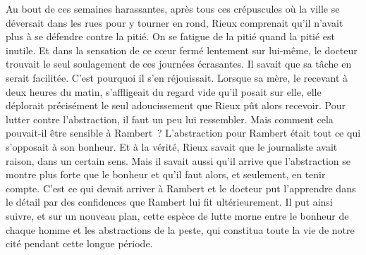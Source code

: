 \documentclass[french,twoside]{book} %
\begin{document}
Au bout de ces semaines harassantes, après tous ces crépuscules où la ville se déversait dans les rues pour y tourner en rond, Rieux comprenait qu’il n’avait plus à se défendre contre la pitié. On se fatigue de la pitié quand la pitié est inutile. Et dans la sensation de ce cœur fermé lentement sur lui-même, le docteur trouvait le seul soulagement de ces journées écrasantes. Il savait que sa tâche en serait facilitée. C’est pourquoi il s’en réjouissait. Lorsque sa mère, le recevant à deux heures du matin, s’affligeait du regard vide qu’il posait sur elle, elle déplorait précisément le seul adoucissement que Rieux pût alors recevoir. Pour lutter contre l’abstraction, il faut un peu lui ressembler. Mais comment cela pouvait-il être sensible à Rambert ? L’abstraction pour Rambert était tout ce qui s’opposait à son bonheur. Et à la vérité, Rieux savait que le journaliste avait raison, dans un certain sens. Mais il savait aussi qu’il arrive que l’abstraction se montre plus forte que le bonheur et qu’il faut alors, et seulement, en tenir compte. C’est ce qui devait arriver à Rambert et le docteur put l’apprendre dans le détail par des confidences que Rambert lui fit ultérieurement. Il put ainsi suivre, et sur un nouveau plan, cette espèce de lutte morne entre le bonheur de chaque homme et les abstractions de la peste, qui constitua toute la vie de notre cité pendant cette longue période.
\end{document}
